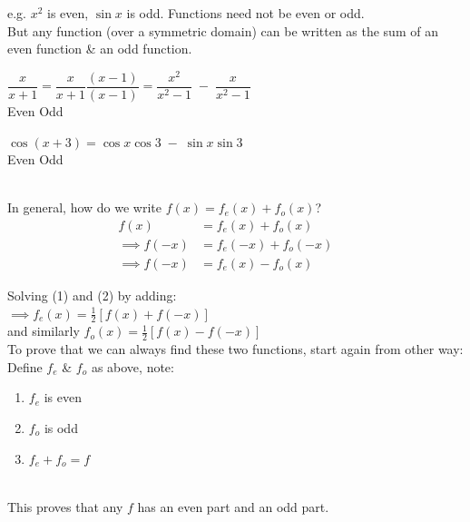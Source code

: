 e.g. $x^2$ is even, $\sin x$ is odd. Functions need not be even or odd.\\

But any function (over a symmetric domain) can be written as the sum of an even function \& an odd function. \\

\begin{example}
$\dfrac{x}{x+1} = \dfrac{x}{x+1} \dfrac{(x-1)}{(x-1)} = \dfrac{x^2}{x^2-1} \;-\; \dfrac{x}{x^2-1}$\\
\hspace*{170pt} Even \hspace{15pt} Odd
\end{example}

\begin{example}
$\cos(x+3) = \cos x \cos 3 \; - \; \sin x \sin 3$\\
\hspace*{130pt} Even \hspace{30pt} Odd\\
\end{example}\\

In general, how do we write $f(x) = f_e(x) + f_o(x)$?
\begin{align}
f(x) &= f_e(x) + f_o(x) &&\\ \nonumber
\implies f(-x) &= f_e(-x) + f_o(-x) &&\\
\implies f(-x) &= f_e(x) - f_o(x)
\end{align}

Solving (1) and (2) by adding: \\

$\implies f_e(x) = \frac{1}{2} [f(x) + f(-x)]$\\

and similarly $f_o(x) = \frac{1}{2} [f(x) - f(-x)]$\\

To prove that we can always find these two functions, start again from other way:\\

Define $f_e$ \& $f_o$ as above, note: 
\begin{enumerate}
\item $f_e$ is even
\item $f_o$ is odd
\item $f_e + f_o = f$
\end{enumerate}\\

This proves that any $f$ has an even part and an odd part.\\

